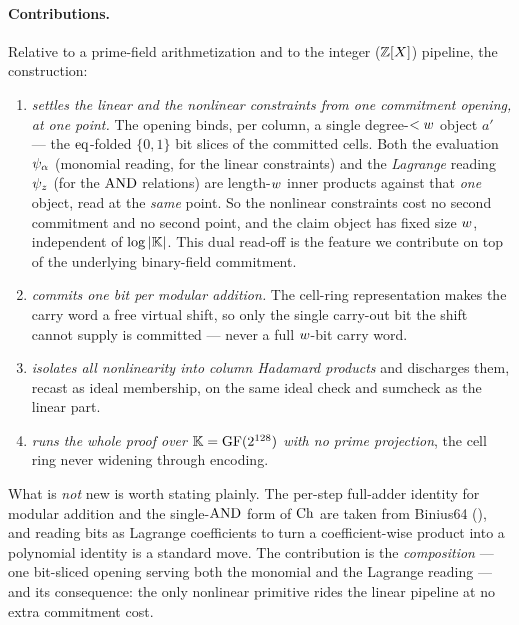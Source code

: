 \paragraph{Contributions.} Relative to a prime-field arithmetization and to the
integer ($\mathbb{Z}[X]$) pipeline, the construction:
\begin{enumerate}[leftmargin=2em]
  \item \emph{settles the linear and the nonlinear constraints from one
    commitment opening, at one point.} The opening binds, per column, a single
    degree-$<w$ object $a'$ --- the $\operatorname{eq}$-folded $\{0,1\}$ bit slices of the
    committed cells. Both the evaluation $\psi_{\alpha}$ (monomial reading, for the
    linear constraints) and the \emph{Lagrange} reading $\psi_{z}$ (for the $\operatorname{AND}$
    relations) are length-$w$ inner products against that \emph{one}
    object, read at the \emph{same} point. So the nonlinear constraints cost no
    second commitment and no second point, and the claim object has fixed size
    $w$, independent of $\log|\mathbb{K}|$. This dual read-off is the feature we
    contribute on top of the underlying binary-field commitment.
  \item \emph{commits one bit per modular addition.} The cell-ring
    representation makes the carry word a free virtual shift, so only the single
    carry-out bit the shift cannot supply is committed --- never a full
    $w$-bit carry word.
  \item \emph{isolates all nonlinearity into column Hadamard products} and
    discharges them, recast as ideal membership, on the same ideal check and
    sumcheck as the linear part.
  \item \emph{runs the whole proof over $\mathbb{K} = \mathrm{GF}(2^{128})$ with no
    prime projection}, the cell ring never widening through encoding.
\end{enumerate}
What is \emph{not} new is worth stating plainly. The per-step full-adder
identity for modular addition and the single-$\operatorname{AND}$ form of $\operatorname{Ch}$ are taken
from Binius64 (), and reading bits as Lagrange coefficients to
turn a coefficient-wise product into a polynomial identity is a standard move.
The contribution is the \emph{composition} --- one bit-sliced opening serving
both the monomial and the Lagrange reading --- and its consequence: the only
nonlinear primitive rides the linear pipeline at no extra commitment cost.

